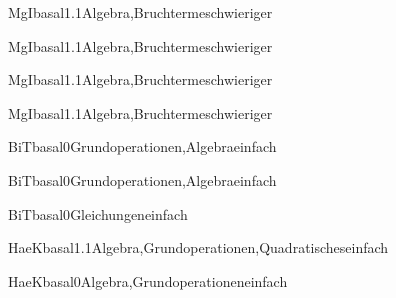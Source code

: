 \documentclass[12pt]{article}
\begin{document}
\begin{Add}{MgI}{basal1.1}{Algebra,Bruchterme}{schwieriger}
\end{Add}

\begin{Add}{MgI}{basal1.1}{Algebra,Bruchterme}{schwieriger}
\end{Add}

\begin{Add}{MgI}{basal1.1}{Algebra,Bruchterme}{schwieriger}
\end{Add}

\begin{Add}{MgI}{basal1.1}{Algebra,Bruchterme}{schwieriger}
\end{Add}



\begin{Add}{BiT}{basal0}{Grundoperationen,Algebra}{einfach}
\end{Add}

\begin{Add}{BiT}{basal0}{Grundoperationen,Algebra}{einfach}
\end{Add}

\begin{Add}{BiT}{basal0}{Gleichungen}{einfach}
      
\end{Add}


\begin{Add}{HaeK}{basal1.1}{Algebra,Grundoperationen,Quadratisches}{einfach}
\end{Add}

\begin{Add}{HaeK}{basal0}{Algebra,Grundoperationen}{einfach}
\end{Add}
\end{document}
